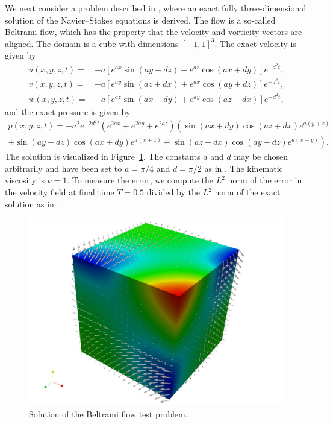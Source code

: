 We next consider a problem described in \citet{EthierSteinmann1994},
where an exact fully three-dimensional solution of the Navier--Stokes
equations is derived. The flow is a so-called Beltrami flow, which has
the property that the velocity and vorticity vectors are aligned. The
domain is a cube with dimensions $[-1, 1]^3$. The exact velocity is
given by
\begin{equation}
  \begin{split}
    u(x,y,z,t) =& -a [ e^{a x} \sin(a y + d z)  + e^{az} \cos(a x + d y) ] e^{-d^{2}t}, \\
    v(x,y,z,t) =& -a [ e^{a y} \sin(a z + d x)  + e^{ax} \cos(a y + d z) ] e^{-d^{2}t}, \\
    w(x,y,z,t) =& -a [ e^{a z} \sin(a x + d y)  + e^{ay} \cos(a z + d x) ] e^{-d^{2}t},
  \end{split}
\end{equation}
and the exact pressure is given by
\begin{multline}
    p(x,y,z,t) = - a^2 e^{-2d^{2}t}
    \left(e^{2ax} + e^{2ay} + e^{2az}\right)
    \left(
    \sin(a x + d y) \cos(a z + d x) e^{a(y+z)} \right.
    \\
    \left. + \sin(a y + d z) \cos(a x + d y) e^{a(x+z)} +
    \sin(a z + d x) \cos(a y + d z) e^{a(x+y)}
    \right).
\end{multline}
The solution is visualized in Figure~\ref{fig:beltrami}. The constants
$a$ and $d$ may be chosen arbitrarily and have been set to $a=\pi/4$
and $d=\pi/2$ as in \citet{EthierSteinmann1994}. The kinematic
viscosity is $\nu = 1$. To measure the error, we compute the $L^2$
norm of the error in the velocity field at final time $T = 0.5$
divided by the $L^2$ norm of the exact solution as in
\citet{EthierSteinmann1994}.

\begin{figure}
\bwfig
  \includegraphics[width=\largefig]{chapters/kvs-1/pdf/new_beltrami_illustration.pdf}
  \caption{Solution of the Beltrami flow test problem.}
  \label{fig:beltrami}
\end{figure}

